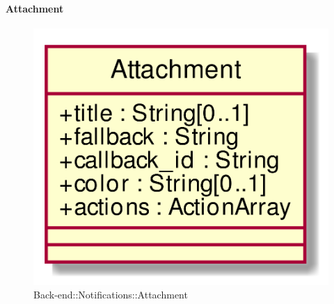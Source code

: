 \hypertarget{Attachment_label}{\paragraph{Attachment}}
\begin{figure}[h]
	\centering
	\includegraphics[width=\textwidth,height=\textheight,keepaspectratio]{images/ClassAttachment.png}
	\caption{Back-end::Notifications::Attachment}
\end{figure}
